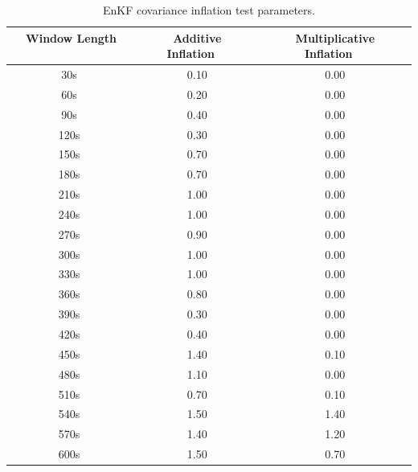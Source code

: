 \begin{table}[h!]
\caption[EnKF covariance inflation test parameters]{EnKF covariance inflation test parameters.}
\begin{center}
\begin{tabular}{ccc}
\hline
{\bf Window Length ~~~~} & {\bf Additive Inflation~~} & {\bf Multiplicative Inflation~~}\\
\hline
\hline
~30s ~& 0.10 & 0.00 \\ \hline
~60s ~& 0.20 & 0.00 \\ \hline
~90s ~& 0.40 & 0.00 \\ \hline
~120s ~& 0.30 & 0.00 \\ \hline
~150s ~& 0.70 & 0.00 \\ \hline
~180s ~& 0.70 & 0.00 \\ \hline
~210s ~& 1.00 & 0.00 \\ \hline
~240s ~& 1.00 & 0.00 \\ \hline
~270s ~& 0.90 & 0.00 \\ \hline
~300s ~& 1.00 & 0.00 \\ \hline
~330s ~& 1.00 & 0.00 \\ \hline
~360s ~& 0.80 & 0.00 \\ \hline
~390s ~& 0.30 & 0.00 \\ \hline
~420s ~& 0.40 & 0.00 \\ \hline
~450s ~& 1.40 & 0.10 \\ \hline
~480s ~& 1.10 & 0.00 \\ \hline
~510s ~& 0.70 & 0.10 \\ \hline
~540s ~& 1.50 & 1.40 \\ \hline
~570s ~& 1.40 & 1.20 \\ \hline
~600s ~& 1.50 & 0.70 \\
\hline
\end{tabular}
\end{center}
\label{table:EnKFCovInfl}
\end{table} 


